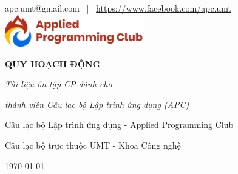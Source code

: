 \begin{titlepage}
\thispagestyle{empty}
\centering

\vspace*{1cm}

{\large apc.umt@gmail.com \, | \, \url{https://www.facebook.com/apc.umt}}\\[1cm]

\includegraphics[width=6cm]{../resource/img/logo.png}\\[3.5cm]
{\fontsize{36}{40}\selectfont\bfseries QUY HOẠCH ĐỘNG\par} 
\vspace{0.6cm}
{\fontsize{18}{22}\selectfont\itshape Tài liệu ôn tập CP dành cho \par}
{\fontsize{18}{22}\selectfont\itshape thành viên Câu lạc bộ Lập trình ứng dụng (APC)\par}
\vspace{5cm}

{\Large Câu lạc bộ Lập trình ứng dụng - Applied Programming Club\par}
\vspace{0.4cm}
{\large Câu lạc bộ trực thuộc UMT - Khoa Công nghệ\par}

\vspace{8cm}

{\Large \today\par}

\vfill
\end{titlepage}
